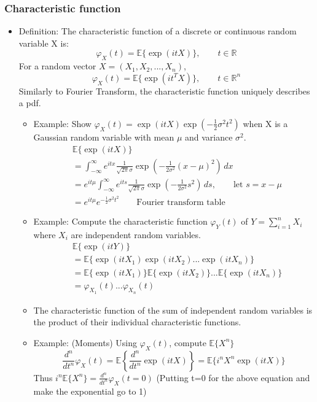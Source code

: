 \documentclass[12pt]{article}
\begin{document}
\subsubsection{Characteristic function}
\begin{itemize}
\item Definition: The characteristic function of a discrete or continuous random variable X is:
\[
\varphi_X(t) = \mathbb{E} \{ \exp (itX)\}, \qquad t \in \mathbb{R}
\]
For a random vector $X=(X_1,X_2,...,X_n)$,
\[
\varphi_X(t) = \mathbb{E} \{ \exp (it^T X)\}, \qquad t \in \mathbb{R}^n
\]
Similarly to Fourier Transform, the characteristic function uniquely describes a pdf.
\begin{itemize}
\item Example: Show $\varphi_X(t) = \exp (itX) \exp (-\frac{1}{2}\sigma^2t^2)$ when X is a Gaussian random variable with mean $\mu$ and variance $\sigma^2$.
\begin{align*}
&\mathbb{E} \{ \exp (itX)\} \\
&= \int_{-\infty}^\infty e^{itx} \frac{1}{\sqrt{2\pi}\sigma} \exp\left(-\frac{1}{2\sigma^2}(x-\mu)^2\right) \, dx \\
&= e^{it\mu} \int_{-\infty}^\infty e^{its} \frac{1}{\sqrt{2\pi}\sigma} \exp\left(-\frac{1}{2\sigma^2}s^2\right) \, ds, \qquad \textrm{let } s = x-\mu \\
&= e^{it\mu}e^{-\frac{1}{2}\sigma^2t^2}   \qquad \textrm{Fourier transform table}
\end{align*}
\item Example: Compute the characteristic function $\varphi_Y(t)$ of $Y= \sum_{i=1}^n X_i$ where $X_i$ are \textcolor{blue1}{independent} random variables.
\begin{align*}
&\mathbb{E} \{ \exp (itY)\} \\
&=  \mathbb{E} \{ \exp (itX_1) \exp (itX_2)... \exp (itX_n)\}\\
&= \mathbb{E} \{ \exp (itX_1)\} \mathbb{E} \{ \exp (itX_2)\}...\mathbb{E} \{ \exp (itX_n)\}\\
&= \varphi_{X_1}(t)...\varphi_{X_n}(t)
\end{align*}
\item The characteristic function of the \textcolor{blue1}{sum of independent random variables} is the \textcolor{blue1}{product} of their individual characteristic functions.

\item Example: (Moments) Using $\varphi_{X}(t)$, compute $\mathbb{E}\{X^n\}$
\[
\frac{d^n}{dt^n}\varphi_{X}(t) = \mathbb{E} \left\{ \frac{d^n}{dt^n} \exp(itX)\right\} = \mathbb{E} \{ i^n X^n \exp(itX)\}
\]
Thus $i^n \mathbb{E}\{X^n\} = \frac{d^n}{dt^n} \varphi_{X}(t=0)$ (Putting t=0 for the above equation and make the exponential go to 1)


\end{itemize}
\end{itemize}
\end{document}
